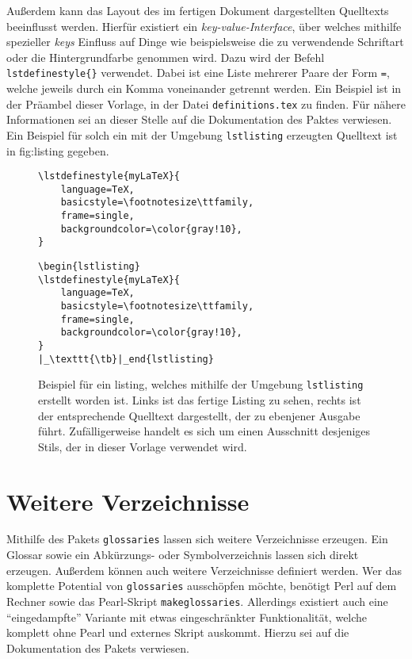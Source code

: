 Außerdem kann das Layout des im fertigen Dokument dargestellten Quelltexts beeinflusst werden. Hierfür existiert ein \emph{key-value-Interface}, über welches
mithilfe spezieller \emph{keys} Einfluss auf Dinge wie beispielsweise die
zu verwendende Schriftart oder die Hintergrundfarbe genommen wird. Dazu
wird der Befehl \texttt{\tb lstdefinestyle\{\}} verwendet.
Dabei ist  eine Liste mehrerer Paare der Form \texttt{=}, welche jeweils durch ein Komma voneinander getrennt werden. Ein Beispiel ist in der Präambel dieser Vorlage, in der Datei \texttt{definitions.tex} zu finden. Für nähere Informationen sei an dieser Stelle auf die Dokumentation des Paktes verwiesen. Ein Beispiel für solch ein mit der Umgebung \texttt{lstlisting} erzeugten Quelltext ist in fig:listing gegeben.
%
\begin{figure}[htb]
	\centering
	\begin{minipage}{.485\textwidth}
		\begin{lstlisting}
\lstdefinestyle{myLaTeX}{
	language=TeX,
	basicstyle=\footnotesize\ttfamily,
	frame=single,
	backgroundcolor=\color{gray!10},
}
		\end{lstlisting}
	\end{minipage}
	\hfill
	\begin{minipage}{.485\textwidth}
		\begin{lstlisting}[style=myBasic]
\begin{lstlisting}
\lstdefinestyle{myLaTeX}{
	language=TeX,
	basicstyle=\footnotesize\ttfamily,
	frame=single,
	backgroundcolor=\color{gray!10},
}
|_\texttt{\tb}|_end{lstlisting}
		\end{lstlisting}
	\end{minipage}
	\caption[Beispiel für ein listing]{%
		Beispiel für ein listing, welches mithilfe der Umgebung
		\texttt{lstlisting} erstellt worden ist. Links ist das fertige
		Listing zu sehen, rechts ist der entsprechende Quelltext dargestellt,
		der zu ebenjener Ausgabe führt. Zufälligerweise handelt es sich um
		einen Ausschnitt desjeniges Stils, der in dieser Vorlage verwendet 
		wird.
	}\label{fig:listing}
\end{figure}
%
%
\section{Weitere Verzeichnisse}
Mithilfe des Pakets \texttt{glossaries} lassen sich weitere Verzeichnisse
erzeugen. Ein Glossar sowie ein Abkürzungs- oder Symbolverzeichnis lassen
sich direkt erzeugen. Außerdem können auch weitere Verzeichnisse definiert
werden. Wer das komplette Potential von \texttt{glossaries} ausschöpfen
möchte, benötigt Perl auf dem Rechner sowie das Pearl-Skript 
\texttt{makeglossaries}. Allerdings existiert auch eine 
\enquote{eingedampfte} Variante mit etwas eingeschränkter Funktionalität,
welche komplett ohne Pearl und externes Skript auskommt. Hierzu sei auf die
Dokumentation des Pakets verwiesen.

